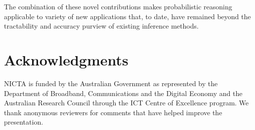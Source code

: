 \documentclass[letterpaper]{article}
\begin{document}
The combination of these novel contributions makes probabilistic
reasoning applicable to variety of new applications that, to date,
have remained beyond the tractability and accuracy purview of existing
inference methods.

\section{Acknowledgments}
NICTA is funded by the Australian Government as represented by
the Department of Broadband, Communications and the Digital
Economy and the Australian Research Council through the ICT
Centre of Excellence program.  We thank anonymous reviewers
for comments that have helped improve the presentation.

\small



\end{document}
